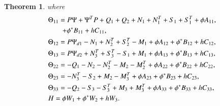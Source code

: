 \documentclass[journal]{IEEEtran}
\newtheorem{theorem}{Theorem}
\begin{document}
\begin{theorem}
  where
  \begin{equation*}
    \begin{gathered}
      {\Theta _{11}} = P\Psi  + {\Psi ^T}P + {Q_1} + {Q_2} + {N_1} + N_1^{T} + {S_1} + S_1^{T} + \phi {A_{11}},\hfill \\
    \quad \quad + {\phi ^*}{B_{11}} + h{C_{11}}, \hfill \\
      {\Theta _{12}} = P{\Psi _{d1}} - {N_1} + N_2^{T} + S_2^{T} - {M_1} + \phi {A_{12}} + {\phi ^*}{B_{12}} + h{C_{12}}, \hfill \\
      {\Theta _{13}} = P{\Psi _{d2}} + N_3^{T} + S_3^{T} - {S_1} + {M_1} + \phi {A_{13}} + {\phi ^*}{B_{13}} + h{C_{13}}, \hfill \\
      {\Theta _{22}} =  - {Q_1} - {N_2} - N_2^{T} - {M_2} - M_2^{T} + \phi {A_{22}} + {\phi ^*}{B_{22}} + h{C_{22}}, \hfill \\
      {\Theta _{23}} =  - N_3^{T} - {S_2} + {M_2} - M_3^{T} + \phi {A_{23}} + {\phi ^*}{B_{23}} + h{C_{23}}, \hfill \\
      {\Theta _{33}} =  - {Q_2} - {S_3} - S_3^{T} + {M_3} + M_3^{T} + \phi {A_{33}} + {\phi ^*}{B_{33}} + h{C_{33}}, \hfill \\
      H = \phi {W_1} + {\phi ^*}{W_2} + h{W_3}. \hfill \\
    \end{gathered}
  \end{equation*}
  \label{theorem4}
\end{theorem}
\end{document}
